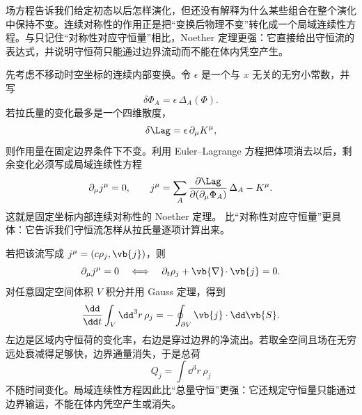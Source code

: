 场方程告诉我们给定初态以后怎样演化，但还没有解释为什么某些组合在整个演化中保持不变。连续对称性的作用正是把“变换后物理不变”转化成一个局域连续性方程。与只记住“对称性对应守恒量”相比，Noether 定理更强：它直接给出守恒流的表达式，并说明守恒荷只能通过边界流动而不能在体内凭空产生。

先考虑不移动时空坐标的连续内部变换。令 $\epsilon$ 是一个与 $x$ 无关的无穷小常数，并写
\begin{equation*}
 \delta\Phi_A=\epsilon\,\Delta_A(\Phi).
\end{equation*}
若拉氏量的变化最多是一个四维散度，
\begin{equation}
 \delta\Lag=\epsilon\,\partial_\mu K^\mu,
 \label{eq:noether-total-derivative-dp61}
\end{equation}
则作用量在固定边界条件下不变。利用 Euler--Lagrange 方程把体项消去以后，剩余变化必须写成局域连续性方程
\begin{equation}
 {
 \partial_\mu j^\mu=0,
 \qquad
 j^\mu
 =\sum_A
 \frac{\partial\Lag}{\partial(\partial_\mu\Phi_A)}\,\Delta_A
 -K^\mu.}
 \label{eq:noether-current-general-dp61}
\end{equation}
这就是固定坐标内部连续对称性的 Noether 定理。 比“对称性对应守恒量”更具体：它告诉我们守恒流怎样从拉氏量逐项计算出来。

若把该流写成 $j^\mu=(c\rho_j,\vb{j})$，则
\begin{equation*}
 \partial_\mu j^\mu=0
 \quad\Longleftrightarrow\quad
 \partial_t\rho_j+\vb{\nabla}\!\cdot\vb{j}=0.
\end{equation*}
对任意固定空间体积 $V$ 积分并用 Gauss 定理，得到
\begin{equation}
 {
 \frac{\dd}{\dd t}\int_V\dd^3 r\,\rho_j
 =-\oint_{\partial V}\vb{j}\cdot\dd\vb{S}.}
 \label{eq:noether-flux-balance-dp61}
\end{equation}
左边是区域内守恒荷的变化率，右边是穿过边界的净流出。若取全空间且场在无穷远处衰减得足够快，边界通量消失，于是总荷
\begin{equation*}
 Q_j=\int\dd^3 r\,\rho_j
\end{equation*}
不随时间变化。局域连续性方程因此比“总量守恒”更强：它还规定守恒量只能通过边界输运，不能在体内凭空产生或消失。

